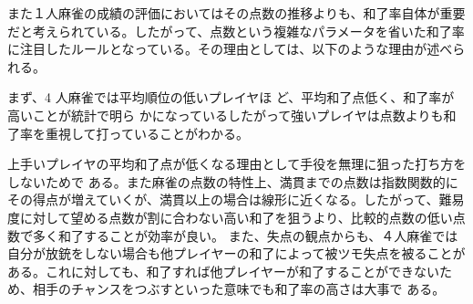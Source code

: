 また１人麻雀の成績の評価においてはその点数の推移よりも、和了率自体が重要だと考えられている。したがって、点数という複雑なパラメータを省いた和了率に注目したルールとなっている。その理由としては、以下のような理由が述べられる。

まず、4 人麻雀では平均順位の低いプレイヤほ ど、平均和了点低く、和了率が高いことが統計で明ら かになっている\cite{kagaku}したがって強いプレイヤは点数よりも和了率を重視して打っていることがわかる。

上手いプレイヤの平均和了点が低くなる理由として手役を無理に狙った打ち方をしないためで
ある。また麻雀の点数の特性上、満貫までの点数は指数関数的にその得点が増えていくが、満貫以上の場合は線形に近くなる。したがって、難易度に対して望める点数が割に合わない高い和了を狙うより、比較的点数の低い点数で゙多く和了することが効率が良い。
また、失点の観点からも、４人麻雀では自分が放銃をしない場合も他プレイヤーの和了によって被ツモ失点を被ることがある。これに対しても、和了すれば他プレイヤーが和了することができないため、相手のチャンスをつぶすといった意味でも和了率の高さは大事で
ある。






